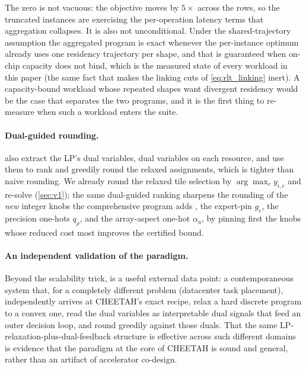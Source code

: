 The zero is not vacuous: the objective moves by $5\times$ across the rows, so
the truncated instances are exercising the per-operation latency terms that
aggregation collapses. It is also not unconditional. Under the shared-trajectory
assumption the aggregated program is exact whenever the per-instance optimum
already uses one residency trajectory per shape, and that is guaranteed when
on-chip capacity does not bind, which is the measured state of every workload in
this paper (the same fact that makes the linking cuts of
\cref{eq:rlt_linking} inert). A capacity-bound workload whose repeated shapes
want divergent residency would be the case that separates the two programs,
and it is the first thing to re-measure when such a workload enters the suite.

\paragraph{Dual-guided rounding.}
\citet{cvxcluster2026} also extract the LP's dual variables, dual variables on
each resource, and use them to rank and greedily round the relaxed assignments,
which is tighter than naive rounding. We already round the relaxed tile selection by
$\arg\max_c y_{i,c}$ and re-solve (\cref{sec:v1}); the same dual-guided ranking
sharpens the rounding of the \emph{new} integer knobs the comprehensive program adds
,  the expert-pin $g_e$, the precision one-hots $q_{\rho}$, and the array-aspect
one-hot $\alpha_a$, by pinning first the knobs whose reduced cost most improves
the certified bound.

\paragraph{An independent validation of the paradigm.}
Beyond the scalability trick, \citet{cvxcluster2026} is a useful external data point:
a contemporaneous system that, for a completely different problem (datacenter task
placement), independently arrives at CHEETAH's exact recipe, relax a hard discrete
program to a convex one, read the dual variables as interpretable dual signals that
feed an outer decision loop, and round greedily against those duals. That the same
LP-relaxation-plus-dual-feedback structure is effective across such different
domains is evidence that the paradigm at the core of CHEETAH is sound and general,
rather than an artifact of accelerator co-design.
